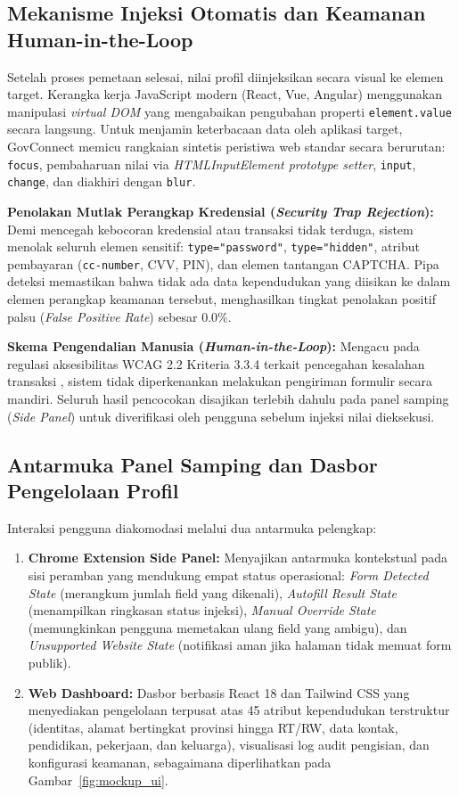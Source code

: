 \documentclass[conference]{IEEEtran}
\begin{document}
\subsection{Mekanisme Injeksi Otomatis dan Keamanan Human-in-the-Loop}
Setelah proses pemetaan selesai, nilai profil diinjeksikan secara visual ke elemen target. Kerangka kerja JavaScript modern (React, Vue, Angular) menggunakan manipulasi \textit{virtual DOM} yang mengabaikan pengubahan properti \texttt{element.value} secara langsung. Untuk menjamin keterbacaan data oleh aplikasi target, GovConnect memicu rangkaian sintetis peristiwa web standar secara berurutan: \texttt{focus}, pembaharuan nilai via \textit{HTMLInputElement prototype setter}, \texttt{input}, \texttt{change}, dan diakhiri dengan \texttt{blur}.

\textbf{Penolakan Mutlak Perangkap Kredensial (\textit{Security Trap Rejection}):} Demi mencegah kebocoran kredensial atau transaksi tidak terduga, sistem menolak seluruh elemen sensitif: \texttt{type="password"}, \texttt{type="hidden"}, atribut pembayaran (\texttt{cc-number}, CVV, PIN), dan elemen tantangan CAPTCHA. Pipa deteksi memastikan bahwa tidak ada data kependudukan yang diisikan ke dalam elemen perangkap keamanan tersebut, menghasilkan tingkat penolakan positif palsu (\textit{False Positive Rate}) sebesar 0.0\%.

\textbf{Skema Pengendalian Manusia (\textit{Human-in-the-Loop}):} Mengacu pada regulasi aksesibilitas WCAG 2.2 Kriteria 3.3.4 terkait pencegahan kesalahan transaksi \cite{W3C2023WCAG}, sistem tidak diperkenankan melakukan pengiriman formulir secara mandiri. Seluruh hasil pencocokan disajikan terlebih dahulu pada panel samping (\textit{Side Panel}) untuk diverifikasi oleh pengguna sebelum injeksi nilai dieksekusi.

\subsection{Antarmuka Panel Samping dan Dasbor Pengelolaan Profil}
Interaksi pengguna diakomodasi melalui dua antarmuka pelengkap:
\begin{enumerate}[label=(\arabic*), leftmargin=*]
    \item \textbf{Chrome Extension Side Panel:} Menyajikan antarmuka kontekstual pada sisi peramban yang mendukung empat status operasional: \textit{Form Detected State} (merangkum jumlah field yang dikenali), \textit{Autofill Result State} (menampilkan ringkasan status injeksi), \textit{Manual Override State} (memungkinkan pengguna memetakan ulang field yang ambigu), dan \textit{Unsupported Website State} (notifikasi aman jika halaman tidak memuat form publik).
    \item \textbf{Web Dashboard:} Dasbor berbasis React 18 dan Tailwind CSS yang menyediakan pengelolaan terpusat atas 45 atribut kependudukan terstruktur (identitas, alamat bertingkat provinsi hingga RT/RW, data kontak, pendidikan, pekerjaan, dan keluarga), visualisasi log audit pengisian, dan konfigurasi keamanan, sebagaimana diperlihatkan pada Gambar~\ref{fig:mockup_ui}.
\end{enumerate}
\end{document}
